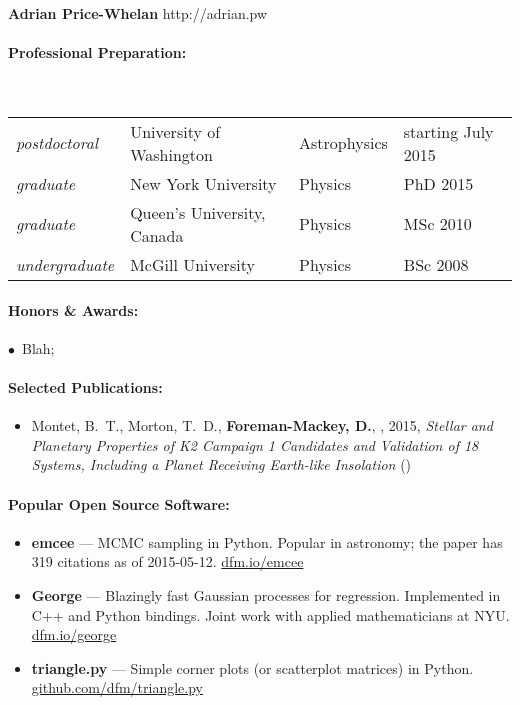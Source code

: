 \documentclass[12pt]{article}
\begin{document}
\noindent
\textbf{Adrian Price-Whelan} \hfill http://adrian.pw
\smallskip

\paragraph{Professional Preparation:}~\\[3pt]
\begin{tabular}{llll}
\textsl{postdoctoral} & University of Washington & Astrophysics & starting
    July 2015 \\
\textsl{graduate} & New York University & Physics & PhD 2015 \\
\textsl{graduate} & Queen's University, Canada & Physics & MSc 2010 \\
\textsl{undergraduate} & McGill University & Physics & BSc 2008 \\
\end{tabular}

\paragraph{Honors \& Awards:}
$\bullet$~Blah;

\paragraph{Selected Publications:}
\begin{itemize}\setlength{\itemsep}{0pt}

\item Montet, B.~T., Morton, T.~D., {\bf Foreman-Mackey, D.}, \etal, 2015,
    \emph{Stellar and Planetary Properties of K2 Campaign 1 Candidates and
          Validation of 18 Systems, Including a Planet Receiving Earth-like
          Insolation} ()

\end{itemize}


\paragraph{Popular Open Source Software:}
\begin{itemize}\setlength{\itemsep}{0pt}

\item {\bf emcee} ---
    MCMC sampling in Python. Popular in astronomy; the paper has 319 citations
    as of 2015-05-12. \url{dfm.io/emcee}

\item {\bf George} ---
    Blazingly fast Gaussian processes for regression. Implemented in C++ and
    Python bindings. Joint work with applied mathematicians at NYU.
    \url{dfm.io/george}

\item {\bf triangle.py} ---
    Simple corner plots (or scatterplot matrices) in Python.
    \url{github.com/dfm/triangle.py}

\end{itemize}
\end{document}
